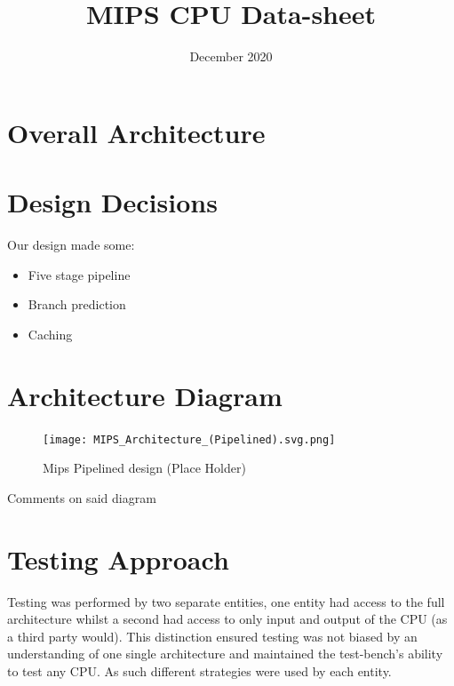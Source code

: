 \documentclass[10pt]{datasheet}
\title{MIPS CPU Data-sheet}
\date{December 2020}
\begin{document}
\maketitle

\section{Overall Architecture}
\smallbreak

\section{Design Decisions}
Our design made some:
\begin{itemize}[noitemsep,nolistsep]
  \item Five stage pipeline
  \item Branch prediction
  \item Caching
\end{itemize}
\smallbreak


\vfill\break

\section{Architecture Diagram}
\smallbreak
\begin{figure}[h]
    \texttt{[image: MIPS\_Architecture\_(Pipelined).svg.png]}
    \captionsetup{justification=centering}
    \caption{Mips Pipelined design (Place Holder)}
\end{figure}

Comments on said diagram


\newpage

\twocolumn

\section{Testing Approach}
\smallbreak
Testing was performed by two separate entities, one entity had access to the full architecture whilst a second had access to only input and output of the CPU (as a third party would). This distinction ensured testing was not biased by an understanding of one single architecture and maintained the test-bench's ability to test any CPU. As such different strategies were used by each entity.
\smallbreak
\end{document}
